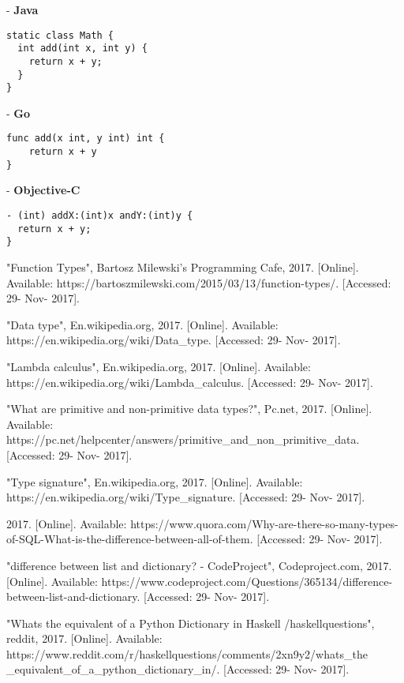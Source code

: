 \documentclass[conference]{IEEEtran}
\begin{document}
- \textbf{Java}
\lstset{language=Java}
\begin{lstlisting}[frame=single]
static class Math {
  int add(int x, int y) {
    return x + y;
  }
}
\end{lstlisting}

- \textbf{Go}
\lstset{language=Pascal}
\begin{lstlisting}[frame=single]
func add(x int, y int) int {
	return x + y
}
\end{lstlisting}

- \textbf{Objective-C}
\lstset{language=c}
\begin{lstlisting}[frame=single]
- (int) addX:(int)x andY:(int)y {
  return x + y;
}
\end{lstlisting}

\begin{thebibliography}{00}
 "Function Types", Bartosz Milewski's Programming Cafe, 2017. [Online]. Available: https://bartoszmilewski.com/2015/03/13/function-types/. [Accessed: 29- Nov- 2017].

 "Data type", En.wikipedia.org, 2017. [Online]. Available: https://en.wikipedia.org/wiki/Data\_type. [Accessed: 29- Nov- 2017].

 "Lambda calculus", En.wikipedia.org, 2017. [Online]. Available: https://en.wikipedia.org/wiki/Lambda\_calculus. [Accessed: 29- Nov- 2017].

 "What are primitive and non-primitive data types?", Pc.net, 2017. [Online]. Available: https://pc.net/helpcenter/answers/primitive\_and\_non\_primitive\_data. [Accessed: 29- Nov- 2017].

 "Type signature", En.wikipedia.org, 2017. [Online]. Available: https://en.wikipedia.org/wiki/Type\_signature. [Accessed: 29- Nov- 2017].

 2017. [Online]. Available: https://www.quora.com/Why-are-there-so-many-types-of-SQL-What-is-the-difference-between-all-of-them. [Accessed: 29- Nov- 2017].

 "difference between list and dictionary? - CodeProject", Codeproject.com, 2017. [Online]. Available: https://www.codeproject.com/Questions/365134/difference-between-list-and-dictionary. [Accessed: 29- Nov- 2017].

 "Whats the equivalent of a Python Dictionary in Haskell /haskellquestions", reddit, 2017. [Online]. Available: https://www.reddit.com/r/haskellquestions/comments/2xn9y2/whats\_the
\_equivalent\_of\_a\_python\_dictionary\_in/. [Accessed: 29- Nov- 2017].


\end{thebibliography}
\end{document}
